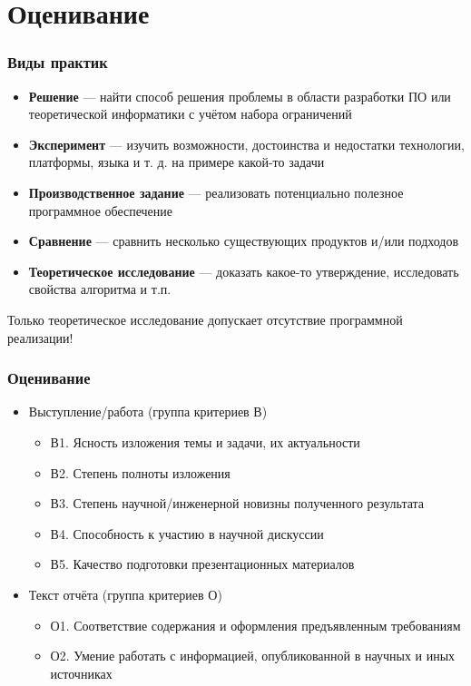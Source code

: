 \documentclass[xetex,mathserif,serif]{beamer}
\begin{document}
    \section{Оценивание}

    \begin{frame}
        \frametitle{Виды практик}
        \begin{itemize}
            \item \textbf{Решение} --- найти способ решения проблемы в области разработки ПО или теоретической информатики с учётом набора ограничений
            \item \textbf{Эксперимент} --- изучить возможности, достоинства и недостатки технологии, платформы, языка и т. д. на примере какой-то задачи
            \item \textbf{Производственное задание} ---  реализовать потенциально полезное программное обеспечение
            \item \textbf{Сравнение} --- сравнить несколько существующих продуктов и/или подходов
            \item \textbf{Теоретическое исследование} --- доказать какое-то утверждение, исследовать свойства алгоритма и т.п.
        \end{itemize}
        Только теоретическое исследование допускает отсутствие программной реализации!
    \end{frame}

    \begin{frame}
        \frametitle{Оценивание}
        \begin{itemize}
            \item Выступление/работа (группа критериев В)
            \begin{itemize}
                \item В1. Ясность изложения темы и задачи, их актуальности
                \item В2. Степень полноты изложения
                \item В3. Степень научной/инженерной новизны полученного результата
                \item В4. Способность к участию в научной дискуссии
                \item В5. Качество подготовки презентационных материалов
            \end{itemize}
            \item Текст отчёта (группа критериев О)
            \begin{itemize}
                \item О1. Соответствие содержания и оформления предъявленным требованиям
                \item О2. Умение работать с информацией, опубликованной в научных и иных источниках
            \end{itemize}
        \end{itemize}
    \end{frame}
\end{document}
